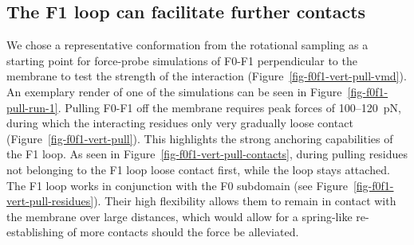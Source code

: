 \documentclass[
  twocolumn]{biophys-new-mod}
\begin{document}
\hypertarget{the-f1-loop-can-facilitate-further-contacts}{%
\subsection{The F1 loop can facilitate further
contacts}\label{the-f1-loop-can-facilitate-further-contacts}}

We chose a representative conformation from the rotational sampling as a
starting point for force-probe simulations of F0-F1 perpendicular to the
membrane to test the strength of the interaction
(Figure~\ref{fig-f0f1-vert-pull-vmd}). An exemplary render of one of the
simulations can be seen in Figure~\ref{fig-f0f1-pull-run-1}. Pulling
F0-F1 off the membrane requires peak forces of 100--120~pN, during which
the interacting residues only very gradually loose contact
(Figure~\ref{fig-f0f1-vert-pull}). This highlights the strong anchoring
capabilities of the F1 loop. As seen in
Figure~\ref{fig-f0f1-vert-pull-contacts}, during pulling residues not
belonging to the F1 loop loose contact first, while the loop stays
attached. The F1 loop works in conjunction with the F0 subdomain (see
Figure~\ref{fig-f0f1-vert-pull-residues}). Their high flexibility allows
them to remain in contact with the membrane over large distances, which
would allow for a spring-like re-establishing of more contacts should
the force be alleviated.
\end{document}
